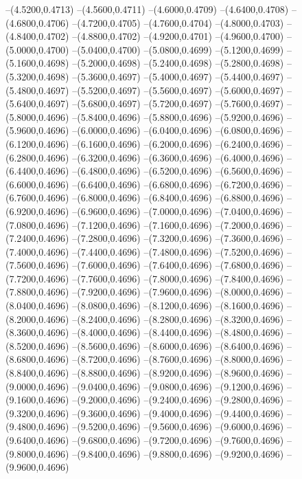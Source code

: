 {	--(4.5200,0.4713)
	--(4.5600,0.4711)
	--(4.6000,0.4709)
	--(4.6400,0.4708)
	--(4.6800,0.4706)
	--(4.7200,0.4705)
	--(4.7600,0.4704)
	--(4.8000,0.4703)
	--(4.8400,0.4702)
	--(4.8800,0.4702)
	--(4.9200,0.4701)
	--(4.9600,0.4700)
	--(5.0000,0.4700)
	--(5.0400,0.4700)
	--(5.0800,0.4699)
	--(5.1200,0.4699)
	--(5.1600,0.4698)
	--(5.2000,0.4698)
	--(5.2400,0.4698)
	--(5.2800,0.4698)
	--(5.3200,0.4698)
	--(5.3600,0.4697)
	--(5.4000,0.4697)
	--(5.4400,0.4697)
	--(5.4800,0.4697)
	--(5.5200,0.4697)
	--(5.5600,0.4697)
	--(5.6000,0.4697)
	--(5.6400,0.4697)
	--(5.6800,0.4697)
	--(5.7200,0.4697)
	--(5.7600,0.4697)
	--(5.8000,0.4696)
	--(5.8400,0.4696)
	--(5.8800,0.4696)
	--(5.9200,0.4696)
	--(5.9600,0.4696)
	--(6.0000,0.4696)
	--(6.0400,0.4696)
	--(6.0800,0.4696)
	--(6.1200,0.4696)
	--(6.1600,0.4696)
	--(6.2000,0.4696)
	--(6.2400,0.4696)
	--(6.2800,0.4696)
	--(6.3200,0.4696)
	--(6.3600,0.4696)
	--(6.4000,0.4696)
	--(6.4400,0.4696)
	--(6.4800,0.4696)
	--(6.5200,0.4696)
	--(6.5600,0.4696)
	--(6.6000,0.4696)
	--(6.6400,0.4696)
	--(6.6800,0.4696)
	--(6.7200,0.4696)
	--(6.7600,0.4696)
	--(6.8000,0.4696)
	--(6.8400,0.4696)
	--(6.8800,0.4696)
	--(6.9200,0.4696)
	--(6.9600,0.4696)
	--(7.0000,0.4696)
	--(7.0400,0.4696)
	--(7.0800,0.4696)
	--(7.1200,0.4696)
	--(7.1600,0.4696)
	--(7.2000,0.4696)
	--(7.2400,0.4696)
	--(7.2800,0.4696)
	--(7.3200,0.4696)
	--(7.3600,0.4696)
	--(7.4000,0.4696)
	--(7.4400,0.4696)
	--(7.4800,0.4696)
	--(7.5200,0.4696)
	--(7.5600,0.4696)
	--(7.6000,0.4696)
	--(7.6400,0.4696)
	--(7.6800,0.4696)
	--(7.7200,0.4696)
	--(7.7600,0.4696)
	--(7.8000,0.4696)
	--(7.8400,0.4696)
	--(7.8800,0.4696)
	--(7.9200,0.4696)
	--(7.9600,0.4696)
	--(8.0000,0.4696)
	--(8.0400,0.4696)
	--(8.0800,0.4696)
	--(8.1200,0.4696)
	--(8.1600,0.4696)
	--(8.2000,0.4696)
	--(8.2400,0.4696)
	--(8.2800,0.4696)
	--(8.3200,0.4696)
	--(8.3600,0.4696)
	--(8.4000,0.4696)
	--(8.4400,0.4696)
	--(8.4800,0.4696)
	--(8.5200,0.4696)
	--(8.5600,0.4696)
	--(8.6000,0.4696)
	--(8.6400,0.4696)
	--(8.6800,0.4696)
	--(8.7200,0.4696)
	--(8.7600,0.4696)
	--(8.8000,0.4696)
	--(8.8400,0.4696)
	--(8.8800,0.4696)
	--(8.9200,0.4696)
	--(8.9600,0.4696)
	--(9.0000,0.4696)
	--(9.0400,0.4696)
	--(9.0800,0.4696)
	--(9.1200,0.4696)
	--(9.1600,0.4696)
	--(9.2000,0.4696)
	--(9.2400,0.4696)
	--(9.2800,0.4696)
	--(9.3200,0.4696)
	--(9.3600,0.4696)
	--(9.4000,0.4696)
	--(9.4400,0.4696)
	--(9.4800,0.4696)
	--(9.5200,0.4696)
	--(9.5600,0.4696)
	--(9.6000,0.4696)
	--(9.6400,0.4696)
	--(9.6800,0.4696)
	--(9.7200,0.4696)
	--(9.7600,0.4696)
	--(9.8000,0.4696)
	--(9.8400,0.4696)
	--(9.8800,0.4696)
	--(9.9200,0.4696)
	--(9.9600,0.4696)
}
